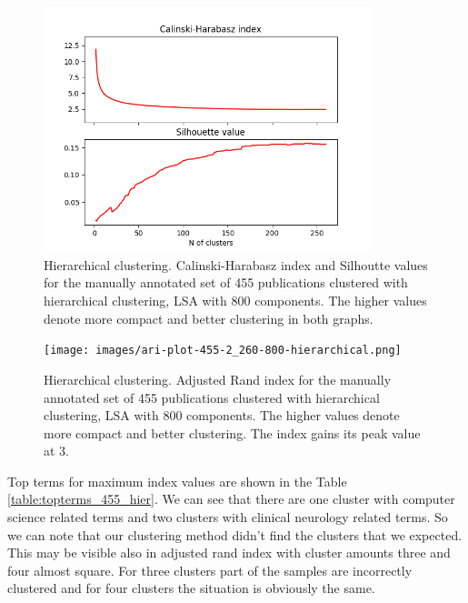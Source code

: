 \begin{figure}[ht]
  \begin{center}    
\includegraphics[width=9.5cm]{images/c-h-silh-index-plot-519-2_260-800-hierarchical.png}
    \caption{Hierarchical clustering. Calinski-Harabasz index and Silhoutte values for the
    manually annotated set of 455 publications clustered with hierarchical
    clustering, LSA with 800 components. The higher values denote 
    more compact and better clustering in both graphs.}
    \label{fig:ch-silh01}
  \end{center}
\end{figure}

\begin{figure}[ht]
  \begin{center}    
\texttt{[image: images/ari-plot-455-2\_260-800-hierarchical.png]}
    \caption{Hierarchical clustering. Adjusted Rand index for the
    manually annotated set of 455 publications clustered with hierarchical
    clustering, LSA with 800 components. The higher values denote 
    more compact and better clustering. The index gains its peak value at $3$.}
    \label{fig:ari01}
  \end{center}
\end{figure}

Top terms for maximum index values are shown in the Table 
\ref{table:topterms_455_hier}. We can see that there are one cluster
with computer science related terms and two clusters with clinical
neurology related terms. So we can note that our clustering method
didn't find the clusters that we expected. This may be visible also
in adjusted rand index with cluster amounts three and four almost
square. For three clusters part of the samples are incorrectly 
clustered and for four clusters the situation is obviously the same.



